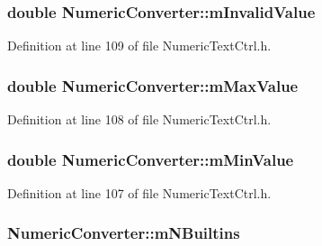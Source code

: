 \subsubsection[{\texorpdfstring{m\+Invalid\+Value}{mInvalidValue}}]{\setlength{\rightskip}{0pt plus 5cm}double Numeric\+Converter\+::m\+Invalid\+Value\hspace{0.3cm}{\ttfamily [protected]}}\hypertarget{class_numeric_converter_a855aebd9efec09dbe697510424d28094}{}\label{class_numeric_converter_a855aebd9efec09dbe697510424d28094}


Definition at line 109 of file Numeric\+Text\+Ctrl.\+h.

\subsubsection[{\texorpdfstring{m\+Max\+Value}{mMaxValue}}]{\setlength{\rightskip}{0pt plus 5cm}double Numeric\+Converter\+::m\+Max\+Value\hspace{0.3cm}{\ttfamily [protected]}}\hypertarget{class_numeric_converter_af73b8b790f15f3fbaf5896c3e6b9a96e}{}\label{class_numeric_converter_af73b8b790f15f3fbaf5896c3e6b9a96e}


Definition at line 108 of file Numeric\+Text\+Ctrl.\+h.

\subsubsection[{\texorpdfstring{m\+Min\+Value}{mMinValue}}]{\setlength{\rightskip}{0pt plus 5cm}double Numeric\+Converter\+::m\+Min\+Value\hspace{0.3cm}{\ttfamily [protected]}}\hypertarget{class_numeric_converter_a3b20fff34e6f70b700c5a197727fd8e0}{}\label{class_numeric_converter_a3b20fff34e6f70b700c5a197727fd8e0}


Definition at line 107 of file Numeric\+Text\+Ctrl.\+h.

\subsubsection[{\texorpdfstring{m\+N\+Builtins}{mNBuiltins}}]{ Numeric\+Converter\+::m\+N\+Builtins\hspace{0.3cm}{\ttfamily [protected]}}\hypertarget{class_numeric_converter_a68ce46f15383844f18d8aebc5c13d6ea}{}\label{class_numeric_converter_a68ce46f15383844f18d8aebc5c13d6ea}


